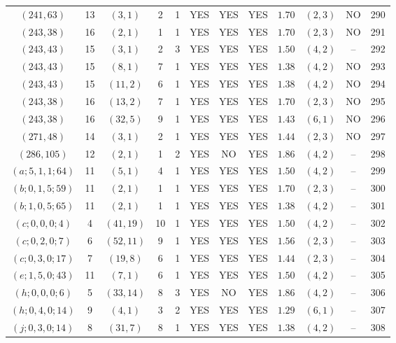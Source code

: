 \begin{longtable}{|c|c|c|c|c|c|c|c|c|c|c|c|}
$(241,63)$ & 13 & $(3,1)$ & 2 & 1 & YES & YES & YES & $1.70$ & $(2,3)$ & NO & 290\\
$(243,38)$ & 16 & $(2,1)$ & 1 & 1 & YES & YES & YES & $1.70$ & $(2,3)$ & NO & 291\\
$(243,43)$ & 15 & $(3,1)$ & 2 & 3 & YES & YES & YES & $1.50$ & $(4,2)$ & -- & 292\\
$(243,43)$ & 15 & $(8,1)$ & 7 & 1 & YES & YES & YES & $1.38$ & $(4,2)$ & NO & 293\\
$(243,43)$ & 15 & $(11,2)$ & 6 & 1 & YES & YES & YES & $1.38$ & $(4,2)$ & NO & 294\\
$(243,38)$ & 16 & $(13,2)$ & 7 & 1 & YES & YES & YES & $1.70$ & $(2,3)$ & NO & 295\\
$(243,38)$ & 16 & $(32,5)$ & 9 & 1 & YES & YES & YES & $1.43$ & $(6,1)$ & NO & 296\\
$(271,48)$ & 14 & $(3,1)$ & 2 & 1 & YES & YES & YES & $1.44$ & $(2,3)$ & NO & 297\\
$(286,105)$ & 12 & $(2,1)$ & 1 & 2 & YES & NO & YES & $1.86$ & $(4,2)$ & -- & 298\\
$(a;5,1,1;64)$ & 11 & $(5,1)$ & 4 & 1 & YES & YES & YES & $1.50$ & $(4,2)$ & -- & 299\\
$(b;0,1,5;59)$ & 11 & $(2,1)$ & 1 & 1 & YES & YES & YES & $1.70$ & $(2,3)$ & -- & 300\\
$(b;1,0,5;65)$ & 11 & $(2,1)$ & 1 & 1 & YES & YES & YES & $1.38$ & $(4,2)$ & -- & 301\\
$(c;0,0,0;4)$ & 4 & $(41,19)$ & 10 & 1 & YES & YES & YES & $1.50$ & $(4,2)$ & -- & 302\\
$(c;0,2,0;7)$ & 6 & $(52,11)$ & 9 & 1 & YES & YES & YES & $1.56$ & $(2,3)$ & -- & 303\\
$(c;0,3,0;17)$ & 7 & $(19,8)$ & 6 & 1 & YES & YES & YES & $1.44$ & $(2,3)$ & -- & 304\\
$(e;1,5,0;43)$ & 11 & $(7,1)$ & 6 & 1 & YES & YES & YES & $1.50$ & $(4,2)$ & -- & 305\\
$(h;0,0,0;6)$ & 5 & $(33,14)$ & 8 & 3 & YES & NO & YES & $1.86$ & $(4,2)$ & -- & 306\\
$(h;0,4,0;14)$ & 9 & $(4,1)$ & 3 & 2 & YES & YES & YES & $1.29$ & $(6,1)$ & -- & 307\\
$(j;0,3,0;14)$ & 8 & $(31,7)$ & 8 & 1 & YES & YES & YES & $1.38$ & $(4,2)$ & -- & 308
\end{longtable}
